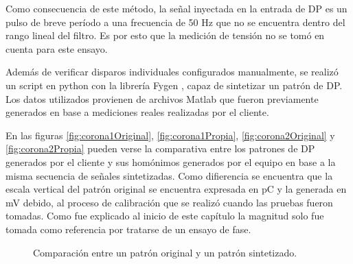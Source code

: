 Como consecuencia de este método, la señal inyectada en la entrada de DP es un pulso de breve período a una frecuencia de 50 Hz que no se encuentra dentro del rango lineal del filtro. Es por esto que la medición de tensión no se tomó en cuenta para este ensayo.

Además de verificar disparos individuales configurados manualmente, se realizó un script en python con la librería Fygen \citep{fygenWeb:1}, capaz de sintetizar un patrón de DP. Los datos utilizados provienen de archivos Matlab que fueron previamente generados en base a mediciones reales realizadas por el cliente.

En las figuras \ref{fig:corona1Original}, \ref{fig:corona1Propia}, \ref{fig:corona2Original} y \ref{fig:corona2Propia} pueden verse la comparativa entre los patrones de DP generados por el cliente y sus homónimos generados por el equipo en base a la misma secuencia de señales sintetizadas. Como difierencia se encuentra que la escala vertical del patrón original se encuentra expresada en pC y la generada en mV debido, al proceso de calibración que se realizó cuando las pruebas fueron tomadas. Como fue explicado al inicio de este capítulo la magnitud solo fue tomada como referencia por tratarse de un ensayo de fase.

\vspace{10mm}

\begin{figure}[htp] 
    \centering
    \hfill%
    \caption{Comparación entre un patrón original y un patrón sintetizado.}
\end{figure}

